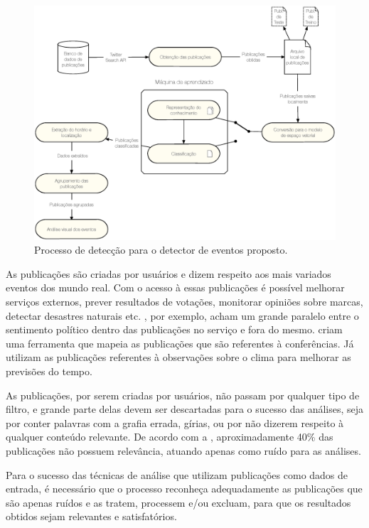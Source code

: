 \begin{figure}[htpb]
\begin{center}
\includegraphics[width=1.0\textwidth]{figuras/fluxograma-deteccao.eps}
\caption{Processo de detecção para o detector de eventos proposto.}
\end{center}
\end{figure}

As publicações são criadas por usuários e dizem respeito aos mais variados eventos dos mundo real. Com o acesso à essas publicações é possível melhorar serviços externos, prever resultados de votações, monitorar opiniões sobre marcas, detectar desastres naturais etc. , por exemplo, acham um grande paralelo entre o sentimento político dentro das publicações no serviço e fora do mesmo.  criam uma ferramenta que mapeia as publicações que são referentes à conferências. Já  utilizam as publicações referentes à observações sobre o clima para melhorar as previsões do tempo.

As publicações, por serem criadas por usuários, não passam por qualquer tipo de filtro, e grande parte delas devem ser descartadas para o sucesso das análises, seja por conter palavras com a grafia errada, gírias, ou por não dizerem respeito à qualquer conteúdo relevante. De acordo com a , aproximadamente 40\% das publicações não possuem relevância, atuando apenas como ruído para as análises.

Para o sucesso das técnicas de análise que utilizam publicações como dados de entrada, é necessário que o processo reconheça adequadamente as publicações que são apenas ruídos e as tratem, processem e/ou excluam, para que os resultados obtidos sejam relevantes e satisfatórios.

